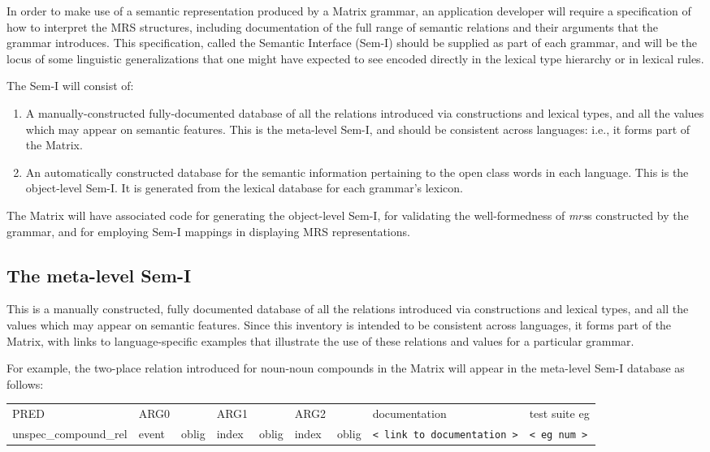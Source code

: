 \documentclass[12pt]{article}
\begin{document}
In order to make use of a semantic representation produced by a Matrix
grammar, an application developer will require a specification of how
to interpret the MRS structures, including documentation of the full
range of semantic relations and their arguments that the grammar introduces.
This specification, called the Semantic Interface (Sem-I) should be supplied
as part of each grammar, and will be the locus of some linguistic 
generalizations that one might have expected to see encoded directly in the
lexical type hierarchy or in lexical rules.

The Sem-I will consist of:
\begin{enumerate}
\item A manually-constructed
fully-documented database of all the relations introduced 
via constructions
and lexical types, and all the values which may appear on semantic 
features.  This is the meta-level Sem-I, and should be consistent across
languages: i.e., it forms part of the Matrix.
\item An automatically constructed database for the semantic information
pertaining to the open class words in each language.
This is the object-level Sem-I.  It is generated from the lexical
database for each grammar's lexicon.
\end{enumerate}

The Matrix will have associated code for generating the object-level
Sem-I, for validating the well-formedness of {\it mrs}s constructed by the 
grammar, and for employing Sem-I mappings in displaying MRS representations.

\subsection{The meta-level Sem-I}

This is a manually constructed,  fully documented database of all the 
relations introduced via constructions and lexical types, and all the values 
which may appear on semantic features.  Since this inventory is intended
to be consistent across languages, it forms part of the Matrix,
with links to language-specific examples that illustrate the use of these
relations and values for a particular grammar.

For example, the two-place relation introduced for noun-noun compounds in
the Matrix will appear in the meta-level Sem-I database as follows:\\
\begin{tabular}{lllllllll}
PRED & ARG0 & & ARG1 & & ARG2 & & documentation & test suite eg\\
unspec\_compound\_rel & event & oblig & 
index & oblig & index & oblig & \verb+< link to documentation >+ & 
\verb+< eg num >+
\end{tabular}
\end{document}
